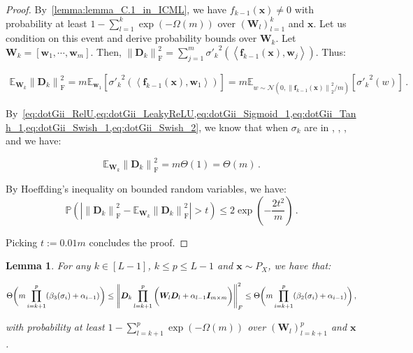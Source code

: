 \documentclass[nohyperref]{article}
\theoremstyle{plain}
\newtheorem{lemma}{Lemma}
\theoremstyle{definition}
\theoremstyle{remark}
\begin{document}
\begin{proof}
By~\cref{lemma:lemma_C.1_in_ICML}, we have $f_{k-1}(\bm{x})\neq 0$ with probability at least $1-\sum_{l=1}^{k}\exp(-\Omega (m))$ over $(\bm{W}_l)_{l=1}^k$ and $\bm{x}$. Let us condition on this event and derive probability bounds over $\bm{W}_k$. Let $\bm{W}_k = [\bm{w}_1,\cdots ,\bm{w}_{m}]$. Then, $\left \| \bm{D}_k \right \|_{\mathrm{F}}^2 = \sum _{j=1}^{m}{\sigma'_k}^2(\left \langle \bm{f}_{k-1}(\bm{x}),\bm{w}_j \right \rangle)$. Thus:

\begin{equation*}
\begin{split}
    \mathbb{E}_{\bm{W}_k}\left \| \bm{D}_k \right \|_{\mathrm{F}}^2 = m\mathbb{E}_{\bm{w}_1}[{\sigma'_k}^2(\left \langle \bm{f}_{k-1}(\bm{x}),\bm{w}_1 \right \rangle)] = m\mathbb{E}_{w\sim \mathcal N(0,{\left \| \bm{f}_{k-1}(\bm{x}) \right \|_2^2}/{m} )}[{\sigma'_k}^2(w)]\,.
\end{split}
\end{equation*}

By~\cref{eq:dotGii_RelU,eq:dotGii_LeakyReLU,eq:dotGii_Sigmoid_1,eq:dotGii_Tanh_1,eq:dotGii_Swish_1,eq:dotGii_Swish_2}, we know that when $\sigma_{k}$ are in , , ,  and  we have:


\begin{equation*}
\mathbb{E}_{\bm{W}_k}\left \| \bm{D}_k \right \|_{\mathrm{F}}^2 =m\Theta (1) = \Theta (m)\,.
\end{equation*}

By Hoeffding’s inequality on bounded random variables, we have:
\begin{equation*}
    \mathbb{P} \left(\left | \left \| \bm{D}_k \right \|_{\mathrm{F}}^2 - \mathbb{E}_{\bm{W}_k}\left \| \bm{D}_k \right \|_{\mathrm{F}}^2 \right |>t \right)\leq 2\exp \left(-\frac{2t^2}{m} \right)\,.
\end{equation*}

Picking $t := 0.01m$ concludes the proof.

\end{proof}

\begin{lemma}
\label{lemma:lemma_C.6_in_ICML}
For any $k \in [L-1]$, $k \leq p \leq L-1$ and $\bm{x}\sim P_X$, we have that:

\begin{equation*}
\small
\Theta \bigg(m\prod_{i=k+1}^{p}(\beta_3(\sigma_i)+\alpha_{i-1} ) \bigg) \leq \left \| \bm{D}_{k}\prod_{l=k+1}^{p}\bigg(\bm{W}_l \bm{D}_{l}+\alpha_{l-1}\bm{I}_{m\times m}\bigg) \right \|_F^2 \leq \Theta \bigg(m\prod_{i=k+1}^{p}(\beta_2(\sigma_i)+\alpha_{i-1} ) \bigg)\,,
\end{equation*}

with probability at least $1-\sum_{l=k+1}^{p}\exp(-\Omega (m))$ over $(\bm{W}_l)_{l=k+1}^p$ and $\bm{x}$.

\end{lemma}
\end{document}
